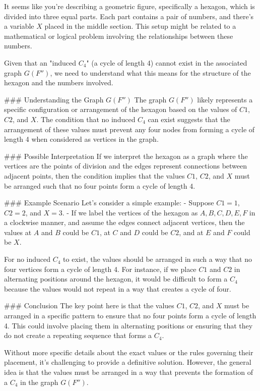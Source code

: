 It seems like you're describing a geometric figure, specifically a hexagon, which is divided into three equal parts. Each part contains a pair of numbers, and there's a variable \(X\) placed in the middle section. This setup might be related to a mathematical or logical problem involving the relationships between these numbers.

Given that an "induced \(C_4\)" (a cycle of length 4) cannot exist in the associated graph \(G(F'')\), we need to understand what this means for the structure of the hexagon and the numbers involved.

### Understanding the Graph \(G(F'')\)
The graph \(G(F'')\) likely represents a specific configuration or arrangement of the hexagon based on the values of \(C1\), \(C2\), and \(X\). The condition that no induced \(C_4\) can exist suggests that the arrangement of these values must prevent any four nodes from forming a cycle of length 4 when considered as vertices in the graph.

### Possible Interpretation
If we interpret the hexagon as a graph where the vertices are the points of division and the edges represent connections between adjacent points, then the condition implies that the values \(C1\), \(C2\), and \(X\) must be arranged such that no four points form a cycle of length 4.

### Example Scenario
Let's consider a simple example:
- Suppose \(C1 = 1\), \(C2 = 2\), and \(X = 3\).
- If we label the vertices of the hexagon as \(A, B, C, D, E, F\) in a clockwise manner, and assume the edges connect adjacent vertices, then the values at \(A\) and \(B\) could be \(C1\), at \(C\) and \(D\) could be \(C2\), and at \(E\) and \(F\) could be \(X\).

For no induced \(C_4\) to exist, the values should be arranged in such a way that no four vertices form a cycle of length 4. For instance, if we place \(C1\) and \(C2\) in alternating positions around the hexagon, it would be difficult to form a \(C_4\) because the values would not repeat in a way that creates a cycle of four.

### Conclusion
The key point here is that the values \(C1\), \(C2\), and \(X\) must be arranged in a specific pattern to ensure that no four points form a cycle of length 4. This could involve placing them in alternating positions or ensuring that they do not create a repeating sequence that forms a \(C_4\).

Without more specific details about the exact values or the rules governing their placement, it's challenging to provide a definitive solution. However, the general idea is that the values must be arranged in a way that prevents the formation of a \(C_4\) in the graph \(G(F'')\).